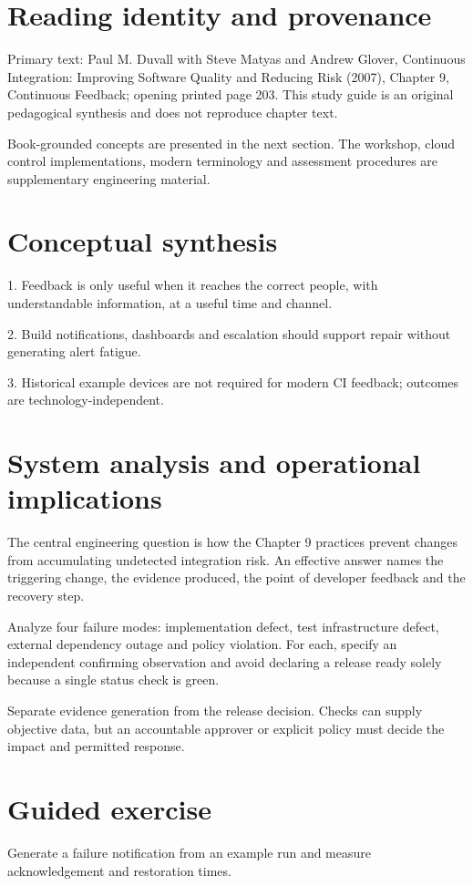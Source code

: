 \documentclass[11pt,letterpaper]{article}
\begin{document}
\makedoctitle
\makedocsummary
\tableofcontents
\clearpage
\section{Reading identity and provenance}
Primary text: Paul M. Duvall with Steve Matyas and Andrew Glover, Continuous Integration: Improving Software Quality and Reducing Risk (2007), Chapter 9, Continuous Feedback; opening printed page 203. This study guide is an original pedagogical synthesis and does not reproduce chapter text.

Book-grounded concepts are presented in the next section. The workshop, cloud control implementations, modern terminology and assessment procedures are supplementary engineering material.

\section{Conceptual synthesis}
1. Feedback is only useful when it reaches the correct people, with understandable information, at a useful time and channel.

2. Build notifications, dashboards and escalation should support repair without generating alert fatigue.

3. Historical example devices are not required for modern CI feedback; outcomes are technology-independent.

\section{System analysis and operational implications}
The central engineering question is how the Chapter 9 practices prevent changes from accumulating undetected integration risk. An effective answer names the triggering change, the evidence produced, the point of developer feedback and the recovery step.

Analyze four failure modes: implementation defect, test infrastructure defect, external dependency outage and policy violation. For each, specify an independent confirming observation and avoid declaring a release ready solely because a single status check is green.

Separate evidence generation from the release decision. Checks can supply objective data, but an accountable approver or explicit policy must decide the impact and permitted response.

\section{Guided exercise}
Generate a failure notification from an example run and measure acknowledgement and restoration times.
\end{document}
